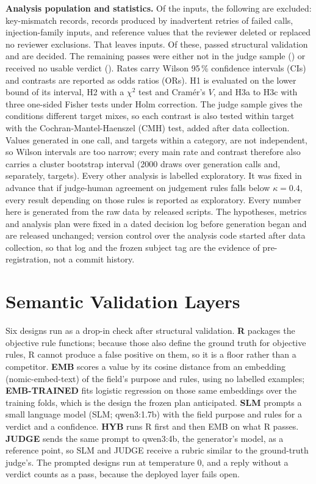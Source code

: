\documentclass[journal]{IEEEtran}
\begin{document}
\textbf{Analysis population and statistics.} Of the  inputs, the following are excluded:  key-mismatch records,
 records produced by inadvertent retries of failed calls,  injection-family
inputs, and\ifreviewed{}  reference values that the reviewer deleted or
replaced\else{} no reviewer exclusions\fi. That leaves  inputs. Of these, 
passed structural validation and  are decided. The remaining passes were either not in
the judge sample () or received no usable verdict
(). Rates carry Wilson 95\,\% confidence intervals (CIs) and contrasts are reported as odds ratios
(ORs). H1 is evaluated on the lower bound of its interval, H2 with a $\chi^2$ test and Cram\'er's $V$,
and H3a to H3c with three one-sided Fisher tests under Holm correction. The judge sample gives the
conditions different target mixes, so each contrast is also tested within target with the
Cochran-Mantel-Haenszel (CMH) test, added after data collection. Values generated in one call, and
targets within a category, are not independent, so Wilson intervals are too narrow; every main rate and
contrast therefore also carries a cluster bootstrap interval (2000 draws over  generation
calls and, separately,  targets). Every other analysis is labelled exploratory. It was
fixed in advance that if judge-human agreement on judgement rules falls below $\kappa=0.4$, every
result depending on those rules is reported as exploratory. Every number here is generated from the raw
data by released scripts. The hypotheses, metrics and analysis plan were fixed in a dated decision log
before generation began and are released unchanged; version control over the analysis code started
after data collection, so that log and the frozen subject tag are the evidence of pre-registration,
not a commit history.

\section{Semantic Validation Layers}
\label{sec:layer}

Six designs run as a drop-in check after structural validation. \textbf{R} packages the objective
rule functions; because those also define the ground truth for objective rules, R cannot produce a
false positive on them, so it is a floor rather than a competitor. \textbf{EMB} scores a
value by its cosine distance from an embedding (nomic-embed-text) of the field's purpose and rules,
using no labelled examples; \textbf{EMB-TRAINED} fits logistic regression on those same embeddings over
the training folds, which is the design the frozen plan anticipated. \textbf{SLM} prompts a small
language model (SLM; qwen3:1.7b) with the field purpose and rules for a verdict and a confidence.
\textbf{HYB} runs R first and then EMB on what R passes. \textbf{JUDGE} sends the same prompt to
qwen3:4b, the generator's model, as a reference point, so SLM and JUDGE receive a rubric similar to the
ground-truth judge's. The prompted designs run at temperature 0, and a reply without a verdict counts
as a pass, because the deployed layer fails open.
\end{document}
